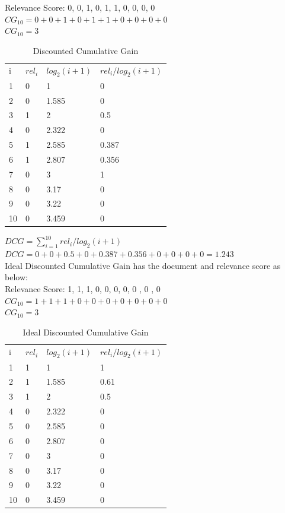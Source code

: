 \documentclass[12pt]{report}
\begin{document}
Relevance Score: 0, 0, 1, 0, 1, 1, 0, 0, 0, 0\\
$CG_{10} = 0+ 0+ 1+ 0+ 1 + 1 + 0 + 0 + 0 + 0$\\
$CG_{10}= 3$ \\
\begin{table}[]
\centering
\caption{Discounted Cumulative Gain}
\label{my-label}
\begin{tabular}{llll}
i & $rel_i$ & $log_2(i + 1)$   & $rel_i / log_2(i + 1)$  \\
1 & 0        & 1     		    & 0    \\
2 & 0        & 1.585 		    & 0 \\
3 & 1        & 2     		    & 0.5  \\
4 & 0        & 2.322 		    & 0 \\
5 & 1        & 2.585 		    & 0.387 \\ 
6 & 1        & 2.807     	    & 0.356    \\
7 & 0        & 3 		    & 1 \\
8 & 0        & 3.17    		    & 0  \\
9 & 0        & 3.22 		    & 0 \\
10 & 0      & 3.459 		    & 0 \\ 
\end{tabular}
\end{table}
$DCG = \sum\limits_{i=1}^{10} rel_i / log_2(i + 1)$ \\
$DCG = 0 + 0 + 0.5 + 0 + 0.387 + 0.356 + 0 + 0 + 0 + 0 =  1.243$\\
Ideal Discounted Cumulative Gain has the document and relevance score as below:\\
Relevance Score: 1, 1, 1, 0, 0, 0, 0, 0 , 0 , 0 \\
$CG_{10} = 1+ 1 + 1+ 0+ 0+ 0+ 0 + 0 + 0 + 0$\\
$CG_{10} = 3$ \\
\begin{table}[]
\centering
\caption{Ideal Discounted Cumulative Gain}
\label{my-label}
\begin{tabular}{llll}
i & $rel_i$ & $log_2(i + 1)$   & $rel_i / log_2(i + 1)$  \\
1 & 1        & 1     		    & 1    \\
2 & 1        & 1.585 		    & 0.61 \\
3 & 1        & 2     		    & 0.5  \\
4 & 0        & 2.322 		    & 0 \\
5 & 0        & 2.585 		    & 0 \\ 
6 & 0        & 2.807     	    & 0   \\
7 & 0        & 3 		    & 0 \\
8 & 0        & 3.17    		    & 0  \\
9 & 0        & 3.22 		    & 0 \\
10 & 0      & 3.459 		    & 0 \\ 
\end{tabular}
\end{table}
\end{document}
